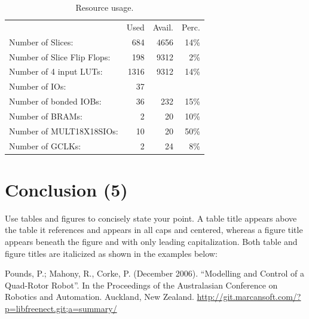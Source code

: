 \documentclass[12pt, letterpaper]{article}
\begin{document}
\begin{table}[h]
\centering
\begin{tabular}{l  r  r  r}
                                       & Used  & Avail. & Perc. \\
  Number of Slices:                    &  684  & 4656  &  14\%  \\
  Number of Slice Flip Flops:          &  198  & 9312  &   2\%  \\
  Number of 4 input LUTs:              & 1316  & 9312  &  14\%  \\
  Number of IOs:                       &   37  &       &      \\
  Number of bonded IOBs:               &   36  &  232  &  15\%  \\
  Number of BRAMs:                     &    2  &   20  &  10\%  \\
  Number of MULT18X18SIOs:             &   10  &   20  &  50\%  \\
  Number of GCLKs:                     &    2  &   24  &   8\%  \\
\end{tabular}
\caption{Resource usage.}
\label{tab:usage}
\end{table}


\section{Conclusion (5)}
Use tables and figures to concisely state your point. A table title appears above the table it references and appears in all caps and centered, whereas a figure title appears beneath the figure and with only leading capitalization. Both table and figure titles are italicized as shown in the examples below:



\begin{thebibliography}{10}
Pounds, P.; Mahony, R., Corke, P. (December 2006). ``Modelling and Control of a Quad-Rotor Robot''. In the Proceedings of the Australasian Conference on Robotics and Automation. Auckland, New Zealand.
 \url{http://git.marcansoft.com/?p=libfreenect.git;a=summary/}
\end{thebibliography}
\end{document}

